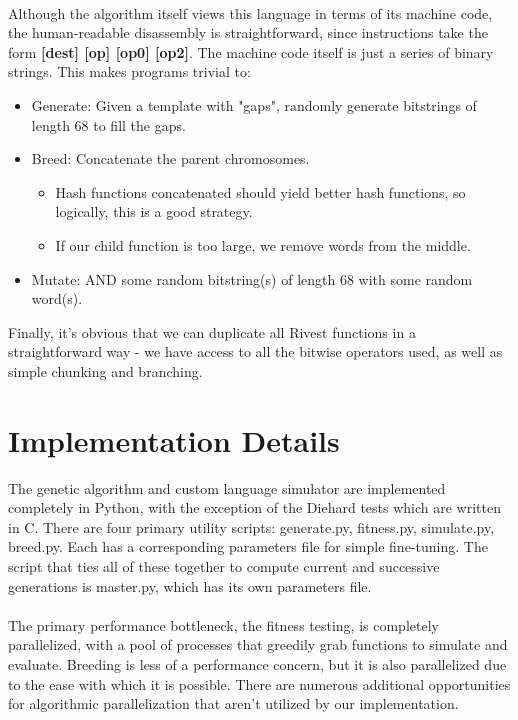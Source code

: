 \documentclass{article}
\begin{document}
\paragraph{}
Although the algorithm itself views this language in terms of its machine code, the human-readable disassembly is straightforward, since instructions take the form \textbf{[dest] [op] [op0] [op2]}. The machine code itself is just a series of binary strings. This makes programs trivial to:
	\begin{itemize}
	\item Generate: Given a template with "gaps", randomly generate bitstrings of length 68 to fill the gaps.
	\item Breed: Concatenate the parent chromosomes.
		\begin{itemize}
			\item Hash functions concatenated should yield better hash functions, so logically, this is a good strategy.
			\item If our child function is too large, we remove words from the middle.
		\end{itemize}
	\item Mutate: AND some random bitstring(s) of length 68 with some random word(s).
	\end{itemize}

Finally, it's obvious that we can duplicate all Rivest functions in a straightforward way - we have access to all the bitwise operators used, as well as simple chunking and branching.

\section{Implementation Details}
The genetic algorithm and custom language simulator are implemented completely in Python, with the exception of the Diehard tests \cite{Diehard} which are written in C. There are four primary utility scripts: generate.py, fitness.py, simulate.py, breed.py. Each has a corresponding parameters file for simple fine-tuning. The script that ties all of these together to compute current and successive generations is master.py, which has its own parameters file.

\paragraph{}
The primary performance bottleneck, the fitness testing, is completely parallelized, with a pool of processes that greedily grab functions to simulate and evaluate. Breeding is less of a performance concern, but it is also parallelized due to the ease with which it is possible. There are numerous additional opportunities for algorithmic parallelization that aren't utilized by our implementation.
\end{document}
